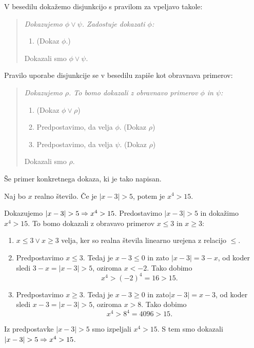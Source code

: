 V besedilu dokažemo disjunkcijo s pravilom za vpeljavo takole:
%
\begin{quote}
  \it
  Dokazujemo $\phi \lor \psi$. Zadostuje dokazati $\phi$:
  \begin{enumerate}
  \item[] (Dokaz $\phi$.)
  \end{enumerate}
  Dokazali smo $\phi \lor \psi$.
\end{quote}
%
Pravilo uporabe disjunkcije se v besedilu zapiše kot obravnava
primerov:
%
\begin{quote}
  \it
  Dokazujemo $\rho$. To bomo dokazali z obravnavo primerov $\phi$ in
  $\psi$:
  \begin{enumerate}
  \item (Dokaz $\phi \lor \rho$)
  \item Predpostavimo, da velja $\phi$. (Dokaz $\rho$)
  \item Predpostavimo, da velja $\psi$. (Dokaz $\rho$)
  \end{enumerate}
  Dokazali smo $\rho$.
\end{quote}
%
Še primer konkretnega dokaza, ki je tako napisan.

\begin{izrek}
  \label{izrek:x-3-5}
  Naj bo $x$ realno število. Če je $|x - 3| > 5$, potem je $x^4 > 15$.
\end{izrek}

\begin{dokaz}
  Dokazujemo $|x - 3| > 5 \Rightarrow x^4 > 15$. Predostavimo $|x - 3| > 5$
  in dokažimo $x^4 > 15$. To bomo dokazali z obravavo primerov $x \leq
  3$ in $x \geq 3$:
  \begin{enumerate}
  \item $x \leq 3 \lor x \geq 3$ velja, ker so realna števila linearno
    urejena z relacijo $\leq$.
  \item Predpostavimo $x \leq 3$. Tedaj je $x - 3 \leq 0$ in zato $|x
    - 3| = 3 - x$, od koder sledi $3 - x = |x - 3| > 5$, oziroma $x <
    -2$. Tako dobimo
    \begin{equation*}
      x^4 > (-2)^4 = 16 > 15.
    \end{equation*}
  \item Predpostavimo $x \geq 3$. Tedaj je $x - 3 \geq 0$ in zato$|x -
    3| = x - 3$, od koder sledi $x - 3 = |x - 3| > 5$, oziroma $x >
    8$. Tako dobimo
    \begin{equation*}
      x^4 > 8^4 = 4096 > 15.
    \end{equation*}
  \end{enumerate}
  Iz predpostavke $|x - 3| > 5$ smo izpeljali $x^4 > 15$. S tem smo
  dokazali $|x - 3| > 5 \Rightarrow x^4 > 15$.
\end{dokaz}

